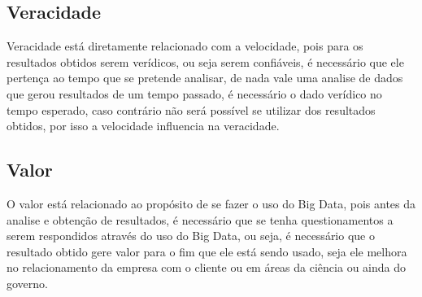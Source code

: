 \subsection{Veracidade}
\label{subsec:veracidade}
Veracidade está diretamente relacionado com a velocidade, pois para os resultados obtidos serem verídicos, ou seja serem confiáveis, é necessário que ele pertença ao tempo que se pretende analisar, de nada vale uma analise de dados que gerou resultados de um tempo passado, é necessário o dado verídico no tempo esperado, caso contrário não será possível se utilizar dos resultados obtidos, por isso a velocidade influencia na veracidade.

\subsection{Valor}
\label{subsec:valor}
O valor está relacionado ao propósito de se fazer o uso do Big Data, pois antes da analise e obtenção de resultados, é necessário que se tenha questionamentos a serem respondidos através do uso do Big Data, ou seja, é necessário que o resultado obtido gere valor para o fim que ele está sendo usado, seja ele melhora no relacionamento da empresa com o cliente ou em áreas da ciência ou ainda do governo.